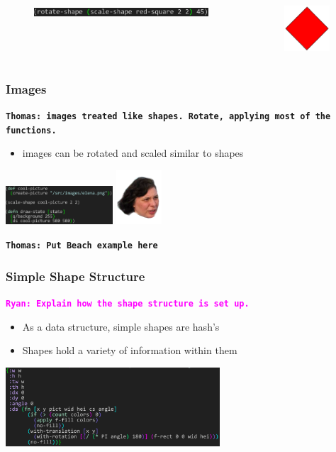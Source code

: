 \documentclass{beamer}
\newcommand{\comment}[1]{{\bf \tt  {#1}}}
\newcommand{\thcomment}[1]{\textcolor{BestBlue}{\comment{Thomas: {#1}}}}
\newcommand{\rmcomment}[1]{\textcolor{magenta}{\comment{Ryan: {#1}}}}
\begin{document}
\begin{frame}[fragile]
\begin{itemize}
		\begin{columns}[t]
		\begin{column}{.45\textwidth}
			\begin{figure}[h]
			\includegraphics[width=6.5cm]{PresentationImages/rotateAndScaleRedCode.png}
			\end{figure}
		\end{column}
		\begin{column}{.3\textwidth}
			\begin{figure}[h]
			\includegraphics[width=1.7cm]{PresentationImages/red-rectangle-scale-rotate.png}
			\end{figure}		
		\end{column}
		\end{columns}
	\end{itemize}
\end{frame}


\begin{frame}
\frametitle{Images}
\thcomment{images treated like shapes. Rotate, applying most of the functions.}
	\begin{itemize}
		\item images can be rotated and scaled similar to shapes
	\end{itemize}
	\includegraphics[width=4cm]{PresentationImages/pictureCode.png}
	\includegraphics[width=1.7cm]{PresentationImages/elena.png}
\end{frame}

\thcomment{Put Beach example here}

\begin{frame}
\frametitle{Simple Shape Structure}
\rmcomment{Explain how the shape structure is set up.}
	\begin{itemize}
		\item As a data structure, simple shapes are hash's
		\item Shapes hold a variety of information within them
	\end{itemize}
	\includegraphics[width=8cm]{PresentationImages/rectHashmap.png}
\end{frame}
\end{document}

